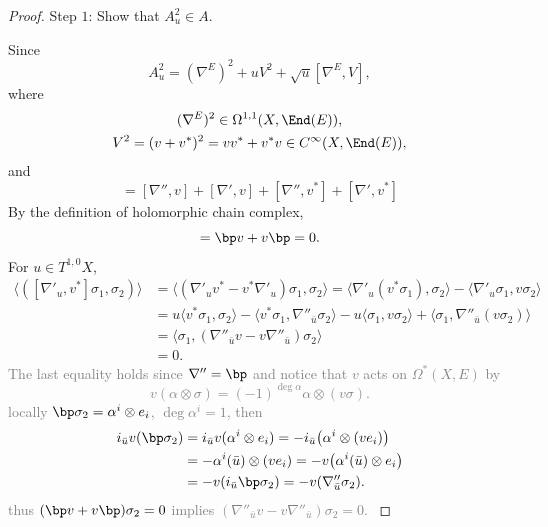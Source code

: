 \begin{proof}
    Step $1$: Show that $A_u^2\in A$.
    
    Since 
    \begin{equation*}
    A_u^2=(\nabla^E)^2+uV^2+\sqrt{u}[\nabla^E,V],
    \end{equation*}
    where
    \begin{gather*}
        (\nabla^E)^2\in\Omega^{1,1}(X,\End(E)), \\
        V^2=(v+v^*)^2=vv^*+v^*v\in C^\infty(X,\End(E)), \\
    \end{gather*}
    and
    \begin{equation*}
        [\nabla^E,V]=[\nabla'',v] + [\nabla',v] + 
        [\nabla'',v^*] + [\nabla',v^*]
    \end{equation*}
    By the definition of holomorphic chain complex, 
    \begin{equation*}
        [\nabla'',v] = \bp v + v\bp = 0.
    \end{equation*}
    For $u\in T^{1,0}X$, 
    \begin{align*}
        \langle([\nabla'_u,v^*]\sigma_1,\sigma_2)\rangle &= 
        \langle(\nabla'_u v^*-v^* \nabla'_u)\sigma_1,\sigma_2\rangle
        =\langle\nabla'_u(v^*\sigma_1),\sigma_2\rangle 
        -\langle\nabla'_u\sigma_1,v\sigma_2\rangle \\
        &=u\langle v^*\sigma_1,\sigma_2\rangle 
        -\langle v^*\sigma_1,\nabla''_{\bar{u}}\sigma_2\rangle 
        -u\langle\sigma_1,v\sigma_2\rangle 
        +\langle\sigma_1,\nabla''_{\bar{u}}(v\sigma_2)\rangle \\
        &=\langle\sigma_1,
        (\nabla''_{\bar{u}}v-v\nabla''_{\bar{u}})\sigma_2\rangle \\
        &=0.
    \end{align*}
    \textcolor{gray}{
    The last equality holds since $\nabla''=\bp$ and notice that 
    $v$ acts on $\Omega^*(X,E)$ by 
    \begin{equation*}
        v(\alpha\otimes\sigma) = (-1)^{\deg\alpha}\alpha\otimes(v\sigma).
    \end{equation*}
    locally $\bp\sigma_2=\alpha^i\otimes e_i$, $\deg\alpha^i=1$, then 
    \begin{align*}
        i_{\bar{u}}v(\bp\sigma_2) 
        &= i_{\bar{u}}v(\alpha^i\otimes e_i) 
        = -i_{\bar{u}}\big(\alpha^i\otimes(v e_i)\big) \\
        &= -\alpha^i(\bar{u})\otimes(v e_i)
        = -v\big(\alpha^i(\bar{u})\otimes e_i\big) \\
        &= -v(i_{\bar{u}}\bp\sigma_2)
        = -v(\nabla''_{\bar{u}}\sigma_2).
    \end{align*}
    thus $(\bp v + v\bp)\sigma_2=0$ implies 
    $(\nabla''_{\bar{u}}v - v\nabla''_{\bar{u}})\sigma_2=0$.
    }


\end{proof}
